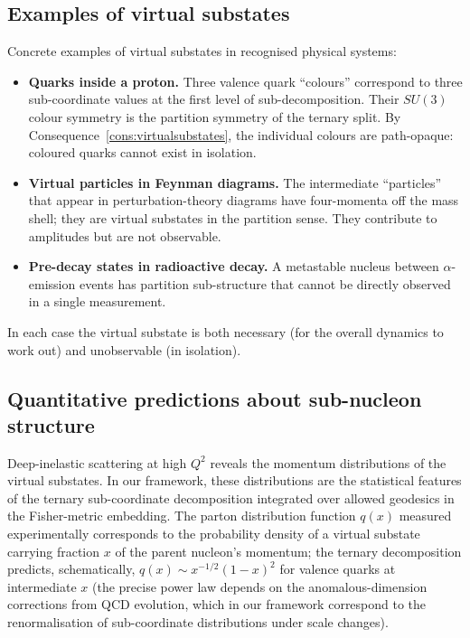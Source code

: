 \documentclass[11pt,twocolumn,a4paper]{article}
\theoremstyle{axiomstyle}
\theoremstyle{conseqstyle}
\theoremstyle{definition}
\theoremstyle{remark}
\begin{document}
\subsection{Examples of virtual substates}

Concrete examples of virtual substates in recognised physical systems:
\begin{itemize}
\item \textbf{Quarks inside a proton.} Three valence quark ``colours'' correspond to three sub-coordinate values at the first level of sub-decomposition. Their $SU(3)$ colour symmetry is the partition symmetry of the ternary split. By Consequence~\ref{cons:virtualsubstates}, the individual colours are path-opaque: coloured quarks cannot exist in isolation.
\item \textbf{Virtual particles in Feynman diagrams.} The intermediate ``particles'' that appear in perturbation-theory diagrams have four-momenta off the mass shell; they are virtual substates in the partition sense. They contribute to amplitudes but are not observable.
\item \textbf{Pre-decay states in radioactive decay.} A metastable nucleus between $\alpha$-emission events has partition sub-structure that cannot be directly observed in a single measurement.
\end{itemize}

In each case the virtual substate is both necessary (for the overall dynamics to work out) and unobservable (in isolation).

\subsection{Quantitative predictions about sub-nucleon structure}

Deep-inelastic scattering at high $Q^{2}$ reveals the momentum distributions of the virtual substates. In our framework, these distributions are the statistical features of the ternary sub-coordinate decomposition integrated over allowed geodesics in the Fisher-metric embedding. The parton distribution function $q(x)$ measured experimentally corresponds to the probability density of a virtual substate carrying fraction $x$ of the parent nucleon's momentum; the ternary decomposition predicts, schematically, $q(x)\sim x^{-1/2}(1-x)^{2}$ for valence quarks at intermediate $x$ (the precise power law depends on the anomalous-dimension corrections from QCD evolution, which in our framework correspond to the renormalisation of sub-coordinate distributions under scale changes).
\end{document}
